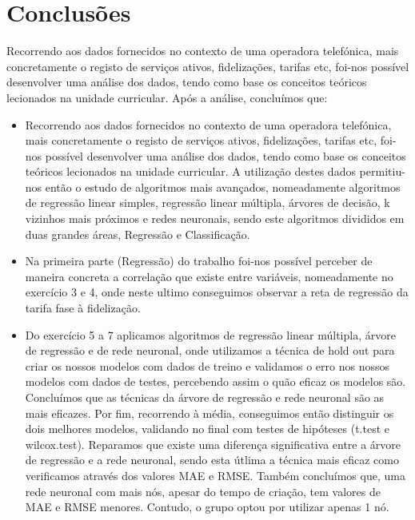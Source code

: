 \section{Conclusões}
Recorrendo aos dados fornecidos no contexto de uma operadora telefónica, mais concretamente o registo de serviços ativos, fidelizações, tarifas etc, foi-nos possível desenvolver uma análise dos dados, tendo como base os conceitos teóricos lecionados na unidade curricular. Após a análise, concluímos que:

\begin{itemize}

\item Recorrendo aos dados fornecidos no contexto de uma operadora telefónica, mais concretamente o registo de serviços ativos, fidelizações, tarifas etc, foi-nos possível desenvolver uma análise dos dados, tendo como base os conceitos teóricos lecionados na unidade curricular. A utilização destes dados permitiu-nos então o estudo de algoritmos mais avançados, nomeadamente algoritmos de regressão linear simples, regressão linear múltipla, árvores de decisão, k vizinhos mais próximos e redes neuronais, sendo este algoritmos divididos em duas grandes áreas, Regressão e Classificação.

\item Na primeira parte (Regressão) do trabalho foi-nos possível perceber de maneira concreta a correlação que existe entre variáveis, nomeadamente no exercício 3 e 4, onde neste ultimo conseguimos observar a reta de regressão da tarifa fase à fidelização. 

\item Do exercício 5 a 7 aplicamos algoritmos de regressão linear múltipla, árvore de regressão e de rede neuronal, onde utilizamos a técnica de hold out para criar os nossos modelos com dados de treino e validamos o erro nos nossos modelos com dados de testes, percebendo assim o quão eficaz os modelos são. Concluímos que as técnicas da árvore de regressão e rede neuronal são as mais eficazes. Por fim, recorrendo à média, conseguimos então distinguir os dois melhores modelos, validando no final com testes de hipóteses (t.test e wilcox.test). Reparamos que existe uma diferença significativa entre a árvore de regressão e a rede neuronal, sendo esta útlima a técnica mais eficaz como verificamos através dos valores MAE e RMSE. Também concluímos que, uma rede neuronal com mais nós, apesar do tempo de criação, tem valores de MAE e RMSE menores. Contudo, o grupo optou por utilizar apenas 1 nó.


\end{itemize}
